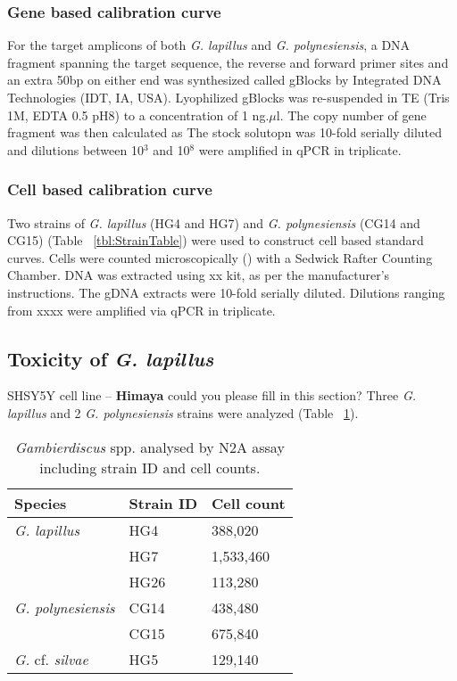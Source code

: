 \documentclass[12pt]{article}
\begin{document}
\subsubsection{Gene based calibration curve}
For the target amplicons of both \emph{G. lapillus} and \emph{G. polynesiensis}, a DNA fragment spanning the target sequence, the reverse and forward primer sites and an extra 50bp on either end was synthesized called gBlocks \textsuperscript{\textregistered} by Integrated DNA Technologies (IDT, IA, USA). Lyophilized gBlocks \textsuperscript{\textregistered} was re-suspended in TE (Tris 1M, EDTA 0.5 pH8) to a concentration of 1 ng.$\mu$l. The copy number of gene fragment was then calculated as 
The stock solutopn was 10-fold serially diluted and dilutions between 10$^{3}$ and 10$^{8}$ were amplified in qPCR in triplicate.


\subsubsection{Cell based calibration curve}
Two strains of \emph{G. lapillus} (HG4 and HG7) and \emph{G. polynesiensis} (CG14 and CG15) (Table ~\ref{tbl:StrainTable}) were used to construct cell based standard curves. Cells were counted microscopically () with a Sedwick Rafter Counting Chamber. DNA was extracted using xx kit, as per the manufacturer's instructions. The gDNA extracts were 10-fold serially diluted. Dilutions ranging from xxxx were amplified via qPCR in triplicate.
\subsection{Toxicity of \emph{G. lapillus}}
SHSY5Y cell line -- \textbf{Himaya} could you please fill in this section?
Three \emph{G. lapillus} and 2 \emph{G. polynesiensis} strains were analyzed (Table ~\ref{tbl:N2ATable}).
\FloatBarrier
\begin{table}
\caption{\emph{Gambierdiscus} spp. analysed by N2A assay including strain ID and cell counts.}
\label{tbl:N2ATable}
\begin{tabular}{ | p{4cm} | p{3cm} | p{2cm} | }
\hline
\textbf{Species} & \textbf{Strain ID}& \textbf{Cell count} \\
\hline
\emph{G. lapillus}&HG4&388,020\\
\hline
&HG7&1,533,460\\
\hline
&HG26&113,280\\
\hline
\emph{G. polynesiensis}&CG14&438,480\\
\hline
&CG15&675,840\\
\hline
\emph{G.} cf. \emph{silvae}&HG5&129,140\\
\hline
\end{tabular}
\end{table}
\FloatBarrier
\end{document}
